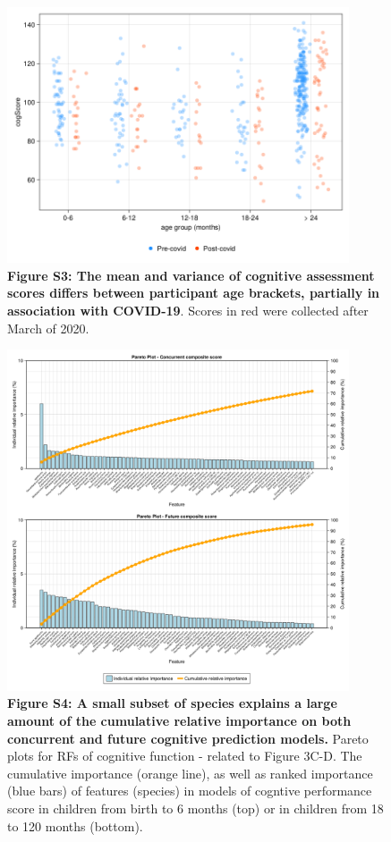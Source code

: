 \documentclass{article}
\begin{document}
\begin{figure}[h]
    \centering
    \includegraphics[width=0.9\textwidth]{assets/Supp_Figure3.png}
    \captionsetup{labelformat=empty}
    \caption{
        \textbf{Figure S3: The mean and variance of cognitive assessment scores differs between participant age brackets,
        partially in association with COVID-19}. Scores in red were collected after March of 2020.
    }
\end{figure}

\begin{figure}[h]
  \centering
  \includegraphics[width=0.9\textwidth]{assets/Supp_Figure4.png}
  \captionsetup{labelformat=empty}
  \caption{
      \textbf{Figure S4: A small subset of species explains a large amount of the cumulative relative importance on both concurrent and future cognitive prediction models.
      } Pareto plots for RFs of cognitive function - related to Figure 3C-D.
      The cumulative importance (orange line), as well as ranked importance (blue bars)
      of features (species) in models of cogntive performance score
      in children from birth to 6 months (top) or
      in children from 18 to 120 months (bottom).
  }
\end{figure}
\end{document}
